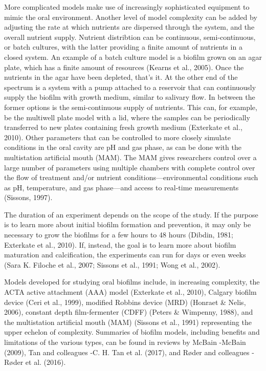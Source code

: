 \documentclass[
  letterpaper,
]{book}
\begin{document}
More complicated models make use of increasingly sophisticated equipment
to mimic the oral environment. Another level of model complexity can be
added by adjusting the rate at which nutrients are dispersed through the
system, and the overall nutrient supply. Nutrient distribtion can be
continuous, semi-continuous, or batch cultures, with the latter
providing a finite amount of nutrients in a closed system. An example of
a batch culture model is a biofilm grown on an agar plate, which has a
finite amount of resources (Kearns et al., 2005). Once the nutrients in
the agar have been depleted, that's it. At the other end of the spectrum
is a system with a pump attached to a reservoir that can continuously
supply the biofilm with growth medium, similar to salivary flow. In
between the former options is the semi-continuous supply of nutrients.
This can, for example, be the multiwell plate model with a lid, where
the samples can be periodically transferred to new plates containing
fresh growth medium (Exterkate et al., 2010). Other parameters that can
be controlled to more closely simulate conditions in the oral cavity are
pH and gas phase, as can be done with the multistation artificial mouth
(MAM). The MAM gives researchers control over a large number of
parameters using multiple chambers with complete control over the flow
of treatment and/or nutrient conditions---environmental conditions such
as pH, temperature, and gas phase---and access to real-time measurements
(Sissons, 1997).

The duration of an experiment depends on the scope of the study. If the
purpose is to learn more about initial biofilm formation and prevention,
it may only be necessary to grow the biofilms for a few hours to 48
hours (Dibdin, 1981; Exterkate et al., 2010). If, instead, the goal is
to learn more about biofilm maturation and calcification, the
experiments can run for days or even weeks (Sara K. Filoche et al.,
2007; Sissons et al., 1991; Wong et al., 2002).

Models developed for studying oral biofilms include, in increasing
complexity, the ACTA active attachment (AAA) model (Exterkate et al.,
2010), Calgary biofilm device (Ceri et al., 1999), modified Robbins
device (MRD) (Honraet \& Nelis, 2006), constant depth film-fermenter
(CDFF) (Peters \& Wimpenny, 1988), and the multistation artificial mouth
(MAM) (Sissons et al., 1991) representing the upper echelon of
complexity. Summaries of biofilm models, including benefits and
limitations of the various types, can be found in reviews by McBain
-McBain (2009), Tan and colleagues -C. H. Tan et al. (2017), and Røder
and colleagues -Røder et al. (2016).
\end{document}
